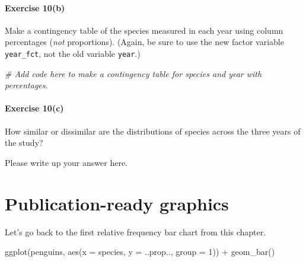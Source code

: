 \documentclass[
]{book}
\newenvironment{Shaded}{\begin{snugshade}}{\end{snugshade}}
\newcommand{\AttributeTok}[1]{\textcolor[rgb]{0.77,0.63,0.00}{#1}}
\newcommand{\CommentTok}[1]{\textcolor[rgb]{0.56,0.35,0.01}{\textit{#1}}}
\newcommand{\DecValTok}[1]{\textcolor[rgb]{0.00,0.00,0.81}{#1}}
\newcommand{\FunctionTok}[1]{\textcolor[rgb]{0.00,0.00,0.00}{#1}}
\newcommand{\NormalTok}[1]{#1}
\newcommand{\SpecialCharTok}[1]{\textcolor[rgb]{0.00,0.00,0.00}{#1}}
\begin{document}
\hypertarget{exercise-10b}{%
\paragraph*{Exercise 10(b)}\label{exercise-10b}}

Make a contingency table of the species measured in each year using column percentages (\emph{not} proportions). (Again, be sure to use the new factor variable \texttt{year\_fct}, not the old variable \texttt{year}.)

\begin{Shaded}
\begin{Highlighting}[]
\CommentTok{\# Add code here to make a contingency table for species and year with percentages.}
\end{Highlighting}
\end{Shaded}

\hypertarget{exercise-10c}{%
\paragraph*{Exercise 10(c)}\label{exercise-10c}}

How similar or dissimilar are the distributions of species across the three years of the study?

Please write up your answer here.

\hypertarget{categorical-pub}{%
\section{Publication-ready graphics}\label{categorical-pub}}

Let's go back to the first relative frequency bar chart from this chapter.

\begin{Shaded}
\begin{Highlighting}[]
\FunctionTok{ggplot}\NormalTok{(penguins, }\FunctionTok{aes}\NormalTok{(}\AttributeTok{x =}\NormalTok{ species, }\AttributeTok{y =}\NormalTok{ ..prop.., }\AttributeTok{group =} \DecValTok{1}\NormalTok{)) }\SpecialCharTok{+}
    \FunctionTok{geom\_bar}\NormalTok{()}
\end{Highlighting}
\end{Shaded}
\end{document}
